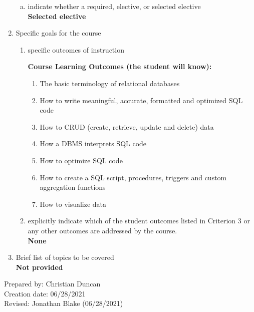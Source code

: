 \begin{enumerate}[1.]
\begin{enumerate}[a.]
\item indicate whether a required, elective, or selected elective\\ %
  {\bfseries
    Selected elective
  }

\end{enumerate}

\item Specific goals for the course
\begin{enumerate}
\item specific outcomes of instruction\\ %
  {\bfseries
    Course Learning Outcomes (the student will know):
\begin{enumerate}
\item The basic terminology of relational databases
\item How to write meaningful, accurate, formatted and optimized SQL code
\item How to CRUD (create, retrieve, update and delete) data
\item How a DBMS interprets SQL code
\item How to optimize SQL code
\item How to create a SQL script, procedures, triggers and custom aggregation functions
\item How to visualize data
\end{enumerate}
  }

\item explicitly indicate which of the student outcomes listed in Criterion 3 or any other outcomes are addressed by the course.\\
  {\bfseries
    None
  }
\end{enumerate}

\item Brief list of topics to be covered\\
  {\bfseries
    Not provided
  }

\end{enumerate}

\noindent Prepared by: Christian Duncan\\
\noindent Creation date: 06/28/2021\\
\noindent Revised: Jonathan Blake (06/28/2021)\\
